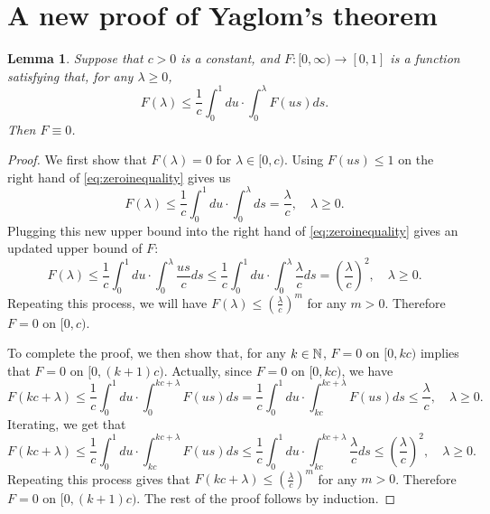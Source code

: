 \documentclass[12pt]{amsart}
\newtheorem{lem}[thm]{Lemma}
\numberwithin{equation}{section}
\newcommand{\expr}[1]{\left( #1 \right)}
\begin{document}
\section{A new proof of Yaglom's theorem}
\label{sec:anewproofofyaglomslaw}
\begin{lem}
\label{lem:zeroinequality}
    Suppose that $c>0$ is a constant, and $F:[0,\infty)\to [0,1]$  is a function satisfying that, for any $\lambda\geq 0$,
\begin{equation}
\label{eq:zeroinequality}
	    F(\lambda)
	\leq
	    \frac{1}{c}\int_0^1du
	\cdot
	    \int_0^\lambda F(us)ds.
\end{equation}
    Then $F\equiv 0$.
\end{lem}
\begin{proof}
	We first show that $F(\lambda)=0$ for $\lambda \in [0,c)$.
    Using  $F(us)\leq 1$ on the right hand of \eqref{eq:zeroinequality} gives us
\begin{equation*}
        F(\lambda)
    \leq
        \frac{1}{c}\int_0^1du
    \cdot
	    \int_0^\lambda ds
	=
	    \frac{\lambda}{c},
	\quad
		\lambda\geq 0.
\end{equation*}
	Plugging this new upper bound into the right hand of \eqref{eq:zeroinequality} gives an updated upper bound of $F$:
\begin{equation*}
        F(\lambda)
    \leq
        \frac{1}{c}\int_0^1du
    \cdot
	    \int_0^\lambda \frac{us}{c}ds
	\leq
        \frac{1}{c}\int_0^1du
    \cdot
	    \int_0^\lambda \frac{\lambda}{c}ds
	=
	    \expr{\frac{\lambda}{c}}^2,
	\quad
		\lambda\geq 0.
\end{equation*}
    Repeating this process, we will have $F(\lambda)\leq (\frac{\lambda}{c})^m$ for any $m>0$. Therefore $F=0$ on $[0,c)$.
\par
    To complete the proof, we then show that, for any $k\in\mathbb N$, $F=0$ on $[0,kc)$ implies that $F=0$ on $[0,(k+1)c)$.
	Actually, since $F=0$ on $[0,kc)$, we have
\begin{equation*}
	    F\expr{kc+\lambda}
	\leq
		\frac{1}{c}\int_0^1 du\cdot\int_0^{kc+\lambda}F(us)ds
	=
		\frac{1}{c}\int_0^1du\cdot\int_{kc}^{kc+\lambda}
	    F(us)ds\leq\frac{\lambda}{c}, \quad \lambda\geq 0.
\end{equation*}
	Iterating, we get that
\begin{equation*}
	    F(kc+\lambda)
	\leq
		\frac{1}{c}\int_0^1du\cdot\int_{kc}^{kc+\lambda} F(us)ds
	\leq
		\frac{1}{c}\int_0^1du\cdot\int_{kc}^{kc+\lambda} \frac{\lambda}{c}ds
	\leq
		\expr{\frac{\lambda}{c}}^2, \quad \lambda\geq 0.
\end{equation*}
	Repeating this process gives that $F(kc+\lambda)\leq (\frac{\lambda}{c})^m$ for any $m>0$. Therefore $F=0$ on $[0,(k+1)c)$. The rest of the proof follows by induction.
\end{proof}
\end{document}
